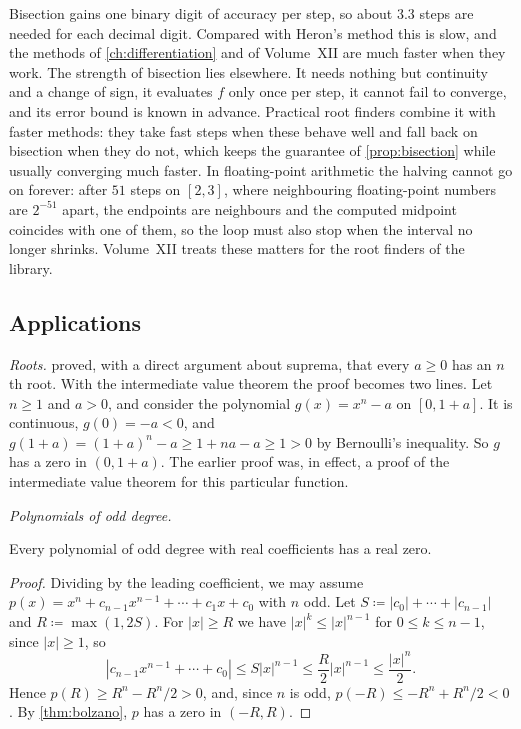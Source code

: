 Bisection gains one binary digit of accuracy per step, so about $3.3$ steps are needed for each decimal digit. Compared with Heron's method this is slow, and the methods of \cref{ch:differentiation} and of Volume~XII are much faster when they work. The strength of bisection lies elsewhere. It needs nothing but continuity and a change of sign, it evaluates $f$ only once per step, it cannot fail to converge, and its error bound is known in advance. Practical root finders combine it with faster methods: they take fast steps when these behave well and fall back on bisection when they do not, which keeps the guarantee of \cref{prop:bisection} while usually converging much faster. In floating-point arithmetic the halving cannot go on forever: after $51$ steps on $[2,3]$, where neighbouring floating-point numbers are $2^{-51}$ apart, the endpoints are neighbours and the computed midpoint coincides with one of them, so the loop must also stop when the interval no longer shrinks. Volume~XII treats these matters for the root finders of the library.

\subsection{Applications}

\emph{Roots.}  proved, with a direct argument about suprema, that every $a\ge0$ has an $n$th root. With the intermediate value theorem the proof becomes two lines. Let $n\ge1$ and $a>0$, and consider the polynomial $g(x)=x^n-a$ on $[0,1+a]$. It is continuous, $g(0)=-a<0$, and $g(1+a)=(1+a)^n-a\ge1+na-a\ge1>0$ by Bernoulli's inequality. So $g$ has a zero in $(0,1+a)$. The earlier proof was, in effect, a proof of the intermediate value theorem for this particular function.

\emph{Polynomials of odd degree.}

\begin{proposition}
\label{prop:odd-degree}
Every polynomial of odd degree with real coefficients has a real zero.
\end{proposition}

\begin{proof}
Dividing by the leading coefficient, we may assume $p(x)=x^n+c_{n-1}x^{n-1}+\cdots+c_1x+c_0$ with $n$ odd. Let $S\coloneqq|c_0|+\cdots+|c_{n-1}|$ and $R\coloneqq\max(1,2S)$. For $|x|\ge R$ we have $|x|^k\le|x|^{n-1}$ for $0\le k\le n-1$, since $|x|\ge1$, so
\[
|c_{n-1}x^{n-1}+\cdots+c_0|\le S|x|^{n-1}\le\frac R2|x|^{n-1}\le\frac{|x|^n}2 .
\]
Hence $p(R)\ge R^n-R^n/2>0$, and, since $n$ is odd, $p(-R)\le-R^n+R^n/2<0$. By \cref{thm:bolzano}, $p$ has a zero in $(-R,R)$.
\end{proof}

